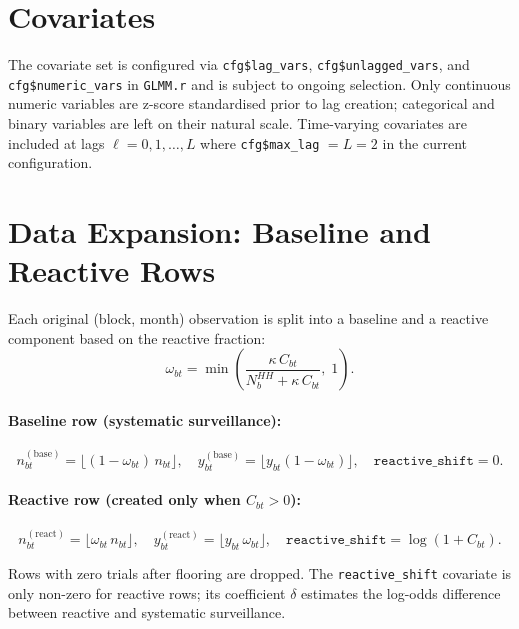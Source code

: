 \documentclass[12pt,a4paper]{article}
\begin{document}
\section{Covariates}

The covariate set is configured via \texttt{cfg\$lag\_vars}, \texttt{cfg\$unlagged\_vars}, and \texttt{cfg\$numeric\_vars} in \texttt{GLMM.r} and is subject to ongoing selection. Only continuous numeric variables are z-score standardised prior to lag creation; categorical and binary variables are left on their natural scale. Time-varying covariates are included at lags $\ell = 0, 1, \ldots, L$ where \texttt{cfg\$max\_lag} $= L = 2$ in the current configuration.

\section{Data Expansion: Baseline and Reactive Rows}
\label{sec:expansion_current}

Each original (block, month) observation is split into a baseline and a reactive component based on the reactive fraction:
\begin{equation}
\omega_{bt} = \min\!\left(\frac{\kappa\, C_{bt}}{N_b^{HH} + \kappa\, C_{bt}},\; 1\right).
\end{equation}

\paragraph{Baseline row (systematic surveillance):}
\begin{equation}
n_{bt}^{(\text{base})} = \lfloor (1 - \omega_{bt})\, n_{bt} \rfloor, \quad
y_{bt}^{(\text{base})} = \lfloor y_{bt}(1-\omega_{bt}) \rfloor, \quad
\texttt{reactive\_shift} = 0.
\end{equation}

\paragraph{Reactive row (created only when $C_{bt} > 0$):}
\begin{equation}
n_{bt}^{(\text{react})} = \lfloor \omega_{bt}\, n_{bt} \rfloor, \quad
y_{bt}^{(\text{react})} = \lfloor y_{bt}\, \omega_{bt} \rfloor, \quad
\texttt{reactive\_shift} = \log(1 + C_{bt}).
\end{equation}

Rows with zero trials after flooring are dropped. The \texttt{reactive\_shift} covariate is only non-zero for reactive rows; its coefficient $\delta$ estimates the log-odds difference between reactive and systematic surveillance.
\end{document}
